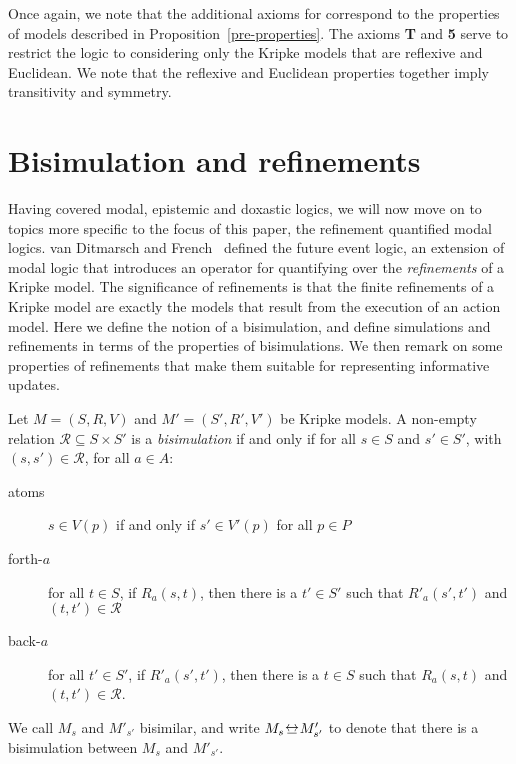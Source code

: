 
Once again, we note that the additional axioms for \axiomS{} correspond to the
properties of \classS{} models described in Proposition~\ref{pre-properties}.
The axioms {\bf T} and {\bf 5} serve to restrict the logic to considering only
the Kripke models that are reflexive and Euclidean.  We note that the reflexive
and Euclidean properties together imply transitivity and symmetry.

\section{Bisimulation and refinements}

Having covered modal, epistemic and doxastic logics, we will now move on to
topics more specific to the focus of this paper, the refinement quantified modal
logics.  van Ditmarsch and French~\cite{french2010future} defined the future
event logic, an extension of modal logic that introduces an operator for
quantifying over the {\em refinements} of a Kripke model. The significance of
refinements is that the finite refinements of a Kripke model are exactly the
models that result from the execution of an action model. Here we define the
notion of a bisimulation, and define simulations and refinements in terms of the
properties of bisimulations.  We then remark on some properties of refinements
that make them suitable for representing informative updates.

\begin{definition}[Bisimulation]
Let $M = (S, R, V)$ and $M' = (S', R', V')$ be Kripke models. A non-empty
relation $\mathcal{R} \subseteq S \times S'$ is a \textit{bisimulation} if and
only if for all $s \in S$ and $s' \in S'$, with $(s, s') \in \mathcal{R}$, for
all $a \in A$:

\begin{description}
\item[atoms] $s \in V(p)$ if and only if $s' \in V'(p)$ for all
$p \in P$

\item[forth-$a$] for all $t \in S$, if $R_a(s, t)$, then there is a
$t' \in S'$ such that $R'_a(s', t')$ and $(t,
t') \in \mathcal{R}$

\item[back-$a$] for all $t' \in S'$, if $R'_a(s',
t')$, then there is a $t \in S$ such that $R_a(s, t)$ and $(t, t')
\in \mathcal{R}$.
\end{description}

We call $M_s$ and $M'_{s'}$ bisimilar, and write $M_s \bisim M'_{s'}$ to denote
that there is a bisimulation between $M_s$ and $M'_{s'}$.
\end{definition}

